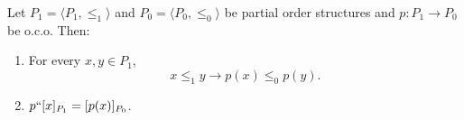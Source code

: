 Let $P_1 = \langle P_1, \leq_1 \rangle$ and $P_0 = \langle P_0, \leq_0 \rangle$ be partial order structures and $p: P_1 \rightarrow P_0$ be o.c.o. Then:

\begin{enumerate}
\item For every $x, y \in P_1$,
$$x \leq_1 y \rightarrow p(x) \leq_0 p(y).$$
\item $p``[x]_{P_1} = [p(x)]_{P_0}$.
\end{enumerate}
